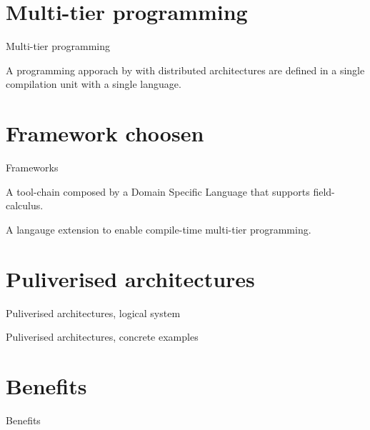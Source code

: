 \documentclass[aspectratio=169]{beamer}
\begin{document}
\section{Multi-tier programming}

\begin{frame}{Multi-tier programming}
\begin{cardTiny}
{\color{accent} A programming apporach by with distributed architectures are defined in a single compilation unit with a single language. }
\end{cardTiny}
\centering
{}
\end{frame}

\section{Framework choosen}
\begin{frame}{Frameworks}%

{
  \begin{card}
  A tool-chain composed by a Domain Specific Language that supports field-calculus.
  \end{card}
  \pause
  \begin{card}[ScalaLoci]
  A langauge extension to enable compile-time multi-tier programming.
  \end{card}
}
\end{frame}

\section{Puliverised architectures}
\begin{frame}{Puliverised architectures, logical system}

\end{frame}
\begin{frame}{Puliverised architectures, concrete examples}

\end{frame}
\section{Benefits}
\begin{frame}{Benefits}

\end{frame}
\end{document}

